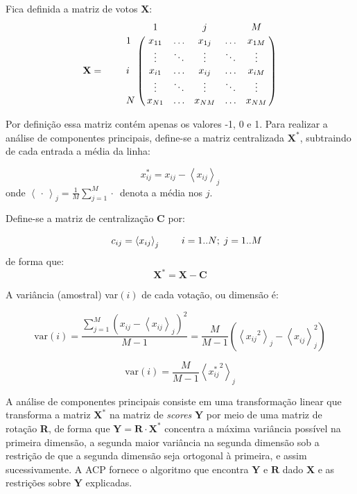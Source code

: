 \documentclass[
	article,			%
	12pt,				%
	oneside,			%
	a4paper,			%
	english,			%
	brazil,				%
	sumario=tradicional,
	oldfontcommands %
	]{abntex2}
\newcommand{\tikzmark}[1]{\tikz[overlay, remember picture] \coordinate (#1);}
\let\bbordermatrix\bordermatrix
\begin{document}
Fica definida a matriz de votos $\mathbf{X}$:
\medskip{}
\[
  \mathbf{X} = \qquad \bbordermatrix{~  & \tikzmark{harrowleft} 1 & ~ & j & ~
                        & M\tikzmark{harrowright}  \cr
                    \tikzmark{varrowtop} 
                    1 & x_{11} & \ldots & x_{1j} & \ldots & x_{1M} \cr
                    ~ & \vdots & \ddots & \vdots & \ddots & \vdots \cr
                    i & x_{i1} & \ldots & x_{ij} & \ldots & x_{iM} \cr
                    ~ & \vdots & \ddots & \vdots & \ddots & \vdots \cr
                    \tikzmark{varrowbottom}
                    N & x_{N1} & \ldots & x_{NM} & \ldots & x_{NM} \cr
                    }
\]

Por definição essa matriz contém apenas os valores -1, 0 e 1. Para realizar a análise de componentes principais, define-se a matriz centralizada $\mathbf{X^{*}}$, subtraindo de cada entrada a média da linha:

\begin{equation}
  x_{ij}^{*} = x_{ij} - \left< x_{ij} \right>_j 
  \label{eq:x-estrela}
\end{equation}
onde $\left< \,\cdot\, \right>_j = \frac{1}{M}\sum_{j=1}^{M} \cdot\,$ denota a média nos $j$.

Define-se a matriz de centralização $\mathbf{C}$ por:

\[
  \begin{array}{r r r r}
    ~ & c_{ij} = \left< x_{ij} \right>_{j} & ~ & i=1..N;\;j=1..M \\
  \end{array}
\]
de forma que:
\[
  \mathbf{X^{*}} = \mathbf{X} - \mathbf{C}
\]

A variância (amostral) var$(i)$ de cada votação, ou dimensão é:

\[
\mathrm{var}(i) = \frac{\sum_{j=1}^M \left( x_{ij} - \left< x_{ij} \right>_j \right)^2 }{M-1}
= \frac{M}{M-1}\left(\left< {x_{ij}}^{2} \right>_{j} - \left< x_{ij}^{~}\right>_{j}^{2} \right)
\]

\begin{equation}
\mathrm{var}(i) = \frac{M}{M-1}\left<{x_{ij}^{*}}^{2}\right>_{j}
\label{eq:variancia}
\end{equation}

A análise de componentes principais consiste em uma transformação linear que transforma a matriz $\mathbf{X^{*}}$ na matriz de \emph{scores} $\mathbf{Y}$ por meio de uma matriz de rotação \textbf{R}, de forma que  $\mathbf{Y} = \mathbf{R}\cdot \mathbf{X^{*}}$ concentra a máxima variância possível na primeira dimensão, a segunda maior variância na segunda dimensão sob a restrição de que a segunda dimensão seja ortogonal à primeira, e assim sucessivamente. A ACP fornece o algoritmo que encontra $\mathbf{Y}$ e $\mathbf{R}$ dado $\mathbf{X}$ e as restrições sobre $\mathbf{Y}$ explicadas. 
\end{document}
